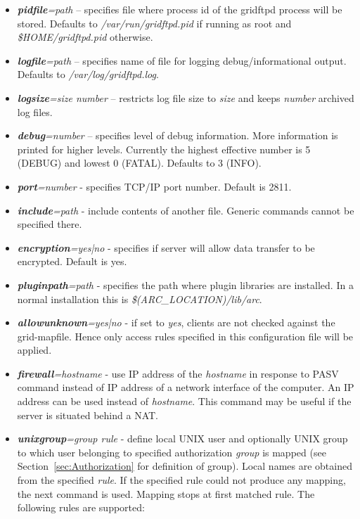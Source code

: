 \documentclass{article}
\begin{document}
\begin{itemize}
\item \textbf{\textit{pidfile}}\textit{=path} -- specifies file where
  process id of the gridftpd process will be stored. Defaults to
  \emph{/var/run/gridftpd.pid} if running as root and
  \emph{\$HOME/gridftpd.pid} otherwise.
\item \textbf{\textit{logfile}}\textit{=path} -- specifies name of file
  for logging debug/informational output. Defaults to
  \emph{/var/log/gridftpd.log}.
\item \textbf{\textit{logsize}}\textit{=size number} -- restricts
  log file size to \emph{size} and keeps \emph{number} archived log
  files.
\item \textbf{\textit{debug}}\textit{=number} -- specifies level of
  debug information. More information is printed for higher
  levels. Currently the highest effective number is 5 (DEBUG) and
  lowest 0 (FATAL). Defaults to 3 (INFO).
\item \textbf{\textit{port}}\textit{=number} - specifies TCP/IP port
  number.  Default is 2811.
\item \textbf{\textit{include}}\textit{=path} - include contents of
  another file. Generic commands cannot be specified there.
\item \textbf{\textit{encryption}}\textit{=yes|no} - specifies if
  server will allow data transfer to be encrypted. Default is yes.
\item \textbf{\textit{pluginpath}}\textit{=path} - specifies the path
  where plugin libraries are installed. In a normal installation this
  is \emph{\$(ARC\_LOCATION)/lib/arc}.
\item \textbf{\textit{allowunknown}}\textit{=yes|no} - if set to
  \emph{yes}, clients are not checked against the grid-mapfile. Hence
  only access rules specified in this configuration file will be
  applied.
\item \textbf{\textit{firewall}}\textit{=hostname} - use IP address of
  the \textit{hostname} in response to PASV command instead of IP
  address of a network interface of the computer. An IP address can be
  used instead of \textit{hostname}. This command may be useful if the
  server is situated behind a NAT.
\item \textbf{\textit{unixgroup}}\textit{=group rule} - define local
  UNIX user and optionally UNIX group to which user belonging to
  specified authorization \textit{group} is mapped (see
  Section~\ref{sec:Authorization} for definition of group). Local
  names are obtained from the specified \textit{rule}. If the
  specified rule could not produce any mapping, the next command is
  used. Mapping stops at first matched rule. The following rules are
  supported:


\end{itemize}
\end{document}
